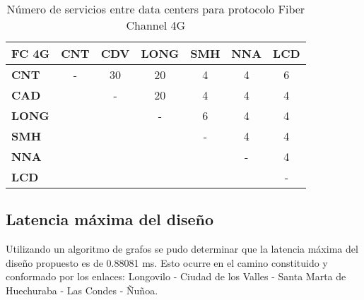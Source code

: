  \begin{table}[H]
   \centering
   \begin{tabular}{| l | c | c | c | c | c | c |}
     \hline
     \textbf{FC 4G} & \textbf{CNT} & \textbf{CDV} & \textbf{LONG} & \textbf{SMH} & \textbf{NNA} & \textbf{LCD} \\
     \hline
     \textbf{CNT}  & - & 30 & 20 & 4 & 4 & 6 \\
     \hline
     \textbf{CAD}  &   & - & 20 & 4 & 4 & 4 \\
     \hline
     \textbf{LONG} &   &   & - & 6 & 4 & 4 \\
     \hline
     \textbf{SMH}  &   &   &   & - & 4 & 4 \\
     \hline
     \textbf{NNA}  &   &   &   &   & - & 4 \\
     \hline
     \textbf{LCD}  &   &   &   &   &   & - \\
     \hline
   \end{tabular}
   \caption{Número de servicios entre data centers para protocolo Fiber Channel 4G}
   \label{tab:FC4G}
 \end{table}

\subsection{Latencia máxima del diseño}
\label{sec:latencia}

Utilizando un algoritmo de grafos se pudo determinar que la latencia
máxima del diseño propuesto es de 0.88081 ms. Esto ocurre en el camino
constituido y conformado por los enlaces: Longovilo - Ciudad de los
Valles - Santa Marta de Huechuraba - Las Condes - Ñuñoa.

